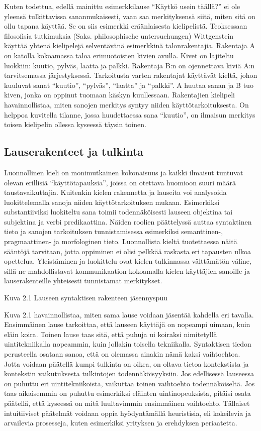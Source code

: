 \documentclass[finnish]{tktltiki2}
\theoremstyle{definition}
\theoremstyle{remark}
\begin{document}
Kuten todettua, edellä mainittu esimerkkilause “Käytkö usein täällä?” ei ole yleensä tulkittavissa sananmukaisesti, vaan saa merkityksensä siitä, miten sitä on ollu tapana käyttää. Se on siis esimerkki eräänlaisesta kielipelistä. Teoksessaan filosofisia tutkimuksia (Saks. philosophische untersuchungen) Wittgenstein käyttää yhtenä kielipelejä selventävänä esimerkkinä talonrakentajia. Rakentaja A on katolla kokoamassa taloa erimuotoisten kivien avulla. Kivet on lajiteltu luokkiin: kuutio, pylväs, laatta ja palkki. Rakentaja B:n on ojennettava kiviä A:n tarvitsemassa järjestyksessä. Tarkoitusta varten rakentajat käyttävät kieltä, johon kuuluvat sanat “kuutio”, “pylväs”, “laatta” ja “palkki”. A huutaa sanan ja B tuo kiven, jonka on oppinut tuomaan käskyn kuullessaan. Rakentajien kielipeli havainnollistaa, miten sanojen merkitys syntyy niiden käyttötarkoituksesta. On helppoa kuvitella tilanne, jossa huudettaessa sana “kuutio”, on ilmaisun merkitys toisen kielipelin ollessa kyseessä täysin toinen.

\subsection{Lauserakenteet ja tulkinta}

Luonnollinen kieli on monimutkainen kokonaisuus ja kaikki ilmaisut tuntuvat olevan erillisiä “käyttötapauksia”, joissa on otettava huomioon suuri määrä taustavaikuttajia. Kuitenkin kielen rakennetta ja lauseita voi analysoida luokittelemalla sanoja niiden käyttötarkoituksen mukaan. Esimerkiksi substantiiviksi luokiteltu sana toimii todennäköisesti lauseen objektina tai subjektina ja verbi predikaattina. Näiden roolien päättelyssä auttaa syntaktinen tieto ja sanojen tarkoituksen tunnistamisessa esimerkiksi semanttinen-, pragmaattinen- ja morfologinen tieto. Luonnollista kieltä tuotettaessa näitä sääntöjä tarvitaan, jotta oppiminen ei olisi pelkkää raskasta eri tapausten ulkoa opettelua. Yleistäminen ja luokittelu ovat kielen tulkinnassa välttämätön väline, sillä ne mahdollistavat kommunikaation kokoamalla kielen käyttäjien sanoille ja lauserakenteille yhteisesti tunnistamat merkitykset. 
 
 
Kuva 2.1 Lauseen syntaktisen rakenteen jäsennyspuu 
 
Kuva 2.1 havainnollistaa, miten sama lause voidaan jäsentää kahdella eri tavalla. Ensimmäinen lause tarkoittaa, että lauseen käyttäjä on nopeampi uimaan, kuin eläin koira. Toinen lause taas sitä, että puhuja ui koiraksi nimitetyllä uintitekniikalla nopeammin, kuin jollakin toisella tekniikalla. Syntaktisen tiedon perusteella osataan sanoa, että on olemassa ainakin nämä kaksi vaihtoehtoa. Jotta voidaan päätellä kumpi tulkinta on oikea, on oltava tietoa kontekstista ja kontekstin vaikutuksesta tulkintojen todennäköisyyksiin. Jos edellisessä lauseessa on puhuttu eri uintitekniikoista, vaikuttaa toinen vaihtoehto todennäköiseltä. Jos taas aikaisemmin on puhuttu esimerkiksi eläinten uintinopeuksista, pitäisi osata päätellä, että kyseessä on mitä luultavimmin ensimmäinen vaihtoehto. Tällaiset intuitiiviset päätelmät voidaan oppia hyödyntämällä heuristisia, eli kokeilevia ja arvailevia prosesseja, kuten esimerkiksi yrityksen ja erehdyksen periaatetta.
\end{document}
